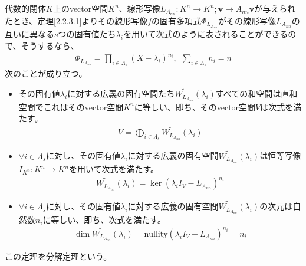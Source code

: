 \documentclass[dvipdfmx]{jsarticle}
\begin{document}
\begin{thm*}
代数的閉体$K$上のvector空間$K^{n}$、線形写像$L_{A_{nn}}:K^{n} \rightarrow K^{n};\mathbf{v} \mapsto A_{nn}\mathbf{v}$が与えられたとき、定理\ref{2.2.3.1}よりその線形写像$f$の固有多項式$\varPhi_{L_{A_{nn}}}$がその線形写像$L_{A_{nn}}$の互いに異なる$s$つの固有値たち$\lambda_{i}$を用いて次式のように表されることができるので、そうするなら、
\begin{align*}
\varPhi_{L_{A_{nn}}} = \prod_{i \in \varLambda_{s}} \left( X - \lambda_{i} \right)^{n_{i}},\ \ \sum_{i \in \varLambda_{s}} n_{i} = n
\end{align*}
次のことが成り立つ。
\begin{itemize}
\item
  その固有値$\lambda_{i}$に対する広義の固有空間たち$\widetilde{W_{L_{A_{nn}}}}\left( \lambda_{i} \right)$すべての和空間は直和空間でこれはそのvector空間$K^{n}$に等しい、即ち、そのvector空間$V$は次式を満たす。
\begin{align*}
V = \bigoplus_{i \in \varLambda_{s}} {\widetilde{W_{L_{A_{nn}}}}\left( \lambda_{i} \right)}
\end{align*}
\item
  $\forall i \in \varLambda_{s}$に対し、その固有値$\lambda_{i}$に対する広義の固有空間$\widetilde{W_{L_{A_{nn}}}}\left( \lambda_{i} \right)$は恒等写像$I_{K^{n}}:K^{n} \rightarrow K^{n}$を用いて次式を満たす。
\begin{align*}
\widetilde{W_{L_{A_{nn}}}}\left( \lambda_{i} \right) = \ker\left( \lambda_{i}I_{V} - L_{A_{nn}} \right)^{n_{i}}
\end{align*}
\item
  $\forall i \in \varLambda_{s}$に対し、その固有値$\lambda_{i}$に対する広義の固有空間$\widetilde{W_{L_{A_{nn}}}}\left( \lambda_{i} \right)$の次元は自然数$n_{i}$に等しい、即ち、次式を満たす。
\begin{align*}
\dim{\widetilde{W_{L_{A_{nn}}}}\left( \lambda_{i} \right)} = {\mathrm{nullity}}\left( \lambda_{i}I_{V} - L_{A_{nn}} \right)^{n_{i}} = n_{i}
\end{align*}
\end{itemize}
この定理を分解定理という。
\end{thm*}
\end{document}
